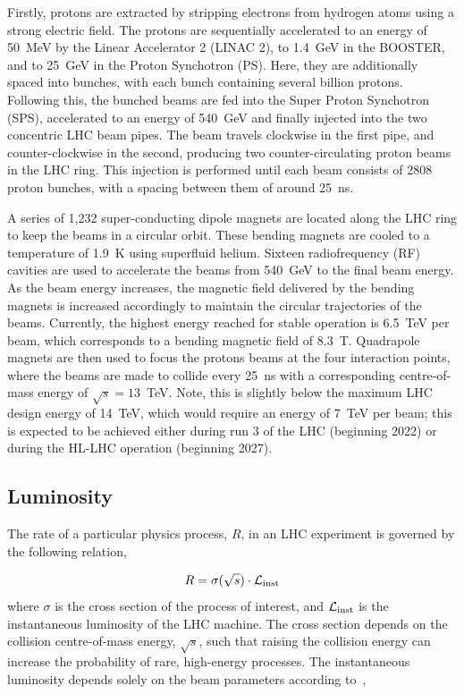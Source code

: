 Firstly, protons are extracted by stripping electrons from hydrogen atoms using a strong electric field. The protons are sequentially accelerated to an energy of 50~MeV by the Linear Accelerator 2 (LINAC 2), to 1.4~GeV in the BOOSTER, and to 25~GeV in the Proton Synchotron (PS). Here, they are additionally spaced into bunches, with each bunch containing several billion protons. Following this, the bunched beams are fed into the Super Proton Synchotron (SPS), accelerated to an energy of 540~GeV and finally injected into the two concentric LHC beam pipes. The beam travels clockwise in the first pipe, and counter-clockwise in the second, producing two counter-circulating proton beams in the LHC ring. This injection is performed until each beam consists of 2808 proton bunches, with a spacing between them of around 25~ns.

A series of 1,232 super-conducting dipole magnets are located along the LHC ring to keep the beams in a circular orbit. These bending magnets are cooled to a temperature of 1.9~K using superfluid helium. Sixteen radiofrequency (RF) cavities are used to accelerate the beams from 540~GeV to the final beam energy. As the beam energy increases, the magnetic field delivered by the bending magnets is increased accordingly to maintain the circular trajectories of the beams. Currently, the highest energy reached for stable operation is 6.5~TeV per beam, which corresponds to a bending magnetic field of 8.3~T. Quadrapole magnets are then used to focus the protons beams at the four interaction points, where the beams are made to collide every 25~ns with a corresponding centre-of-mass energy of $\sqrt{s}=13$~TeV. Note, this is slightly below the maximum LHC design energy of 14~TeV, which would require an energy of 7~TeV per beam; this is expected to be achieved either during run 3 of the LHC (beginning 2022) or during the HL-LHC operation (beginning 2027).

\subsection{Luminosity}
The rate of a particular physics process, $R$, in an LHC experiment is governed by the following relation,

\begin{equation}\label{eq:lumi_rate}
    R = \sigma(\sqrt{s}) \cdot \mathcal{L}_{\rm{inst}}
\end{equation}
\noindent
where $\sigma$ is the cross section of the process of interest, and $\mathcal{L}_{\rm{inst}}$ is the instantaneous luminosity of the LHC machine. The cross section depends on the collision centre-of-mass energy, $\sqrt{s}$, such that raising the collision energy can increase the probability of rare, high-energy processes. The instantaneous luminosity depends solely on the beam parameters according to~\cite{},

